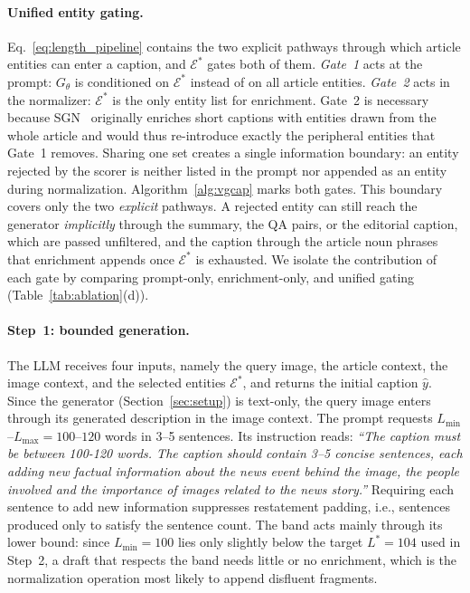 \documentclass[runningheads]{llncs}
\DeclareRobustCommand{\aciids}[1]{{\color{olive}#1}}
\DeclareRobustCommand{\revise}[1]{{\color{blue}#1}}
\DeclareRobustCommand{\todo}[1]{\ifblank{#1}%
     {{\color{red}\textbf{TBD}}}%
     {{\color{red}\textbf{[TODO:}~#1\textbf{]}}}}
\DeclareRobustCommand{\aciids}[1]{#1}
\DeclareRobustCommand{\revise}[1]{#1}
\DeclareRobustCommand{\todo}[1]{\PackageError{revision}{Unresolved TODO}{}}
\begin{document}
\paragraph{\aciids{Unified entity gating.}}
\label{sec:entity_conditioning}
\aciids{Eq.~\eqref{eq:length_pipeline} contains the two explicit pathways through which article entities can enter a caption, and $\mathcal{E}^{*}$ gates both of them. \emph{Gate~1} acts at the prompt: $G_{\theta}$ is conditioned on $\mathcal{E}^{*}$ instead of on all article entities. \emph{Gate~2} acts in the normalizer: $\mathcal{E}^{*}$ is the only \revise{entity list} for enrichment. Gate~2 is necessary because SGN~\cite{recap} originally enriches short captions with entities drawn from the whole article and would thus re-introduce exactly the peripheral entities that Gate~1 removes. Sharing one set creates a single information boundary: \revise{an entity rejected by the scorer is neither listed in the prompt nor appended as an entity during normalization.} Algorithm~\ref{alg:vgcap} marks both gates.}
\aciids{This boundary covers only the two \emph{explicit} pathways. A rejected entity can still reach the generator \emph{implicitly} through the summary, the QA pairs, or the editorial caption, which are passed unfiltered\revise{, and the caption through the article noun phrases that enrichment appends once $\mathcal{E}^{*}$ is exhausted}. We isolate the contribution of each gate by comparing prompt-only, enrichment-only, and unified gating (Table~\ref{tab:ablation}(d)).} %

\paragraph{\aciids{Step~1: bounded generation.}} \aciids{The LLM receives four inputs, namely the query image, the article context, the image context, and the selected entities $\mathcal{E}^{*}$, and returns the initial caption $\hat{y}$.} \revise{Since the generator (Section~\ref{sec:setup}) is text-only, the query image enters through its generated description in the image context.} The prompt requests $L_{\min}$--$L_{\max}=100$--$120$ words in 3--5 sentences. \revise{Its instruction reads: \emph{``The caption must be between 100-120 words. The caption should contain 3--5 concise sentences, each adding new factual information about the news event behind the image, the people involved and the importance of images related to the news story.''} Requiring each sentence to add new information suppresses restatement padding, i.e., sentences produced only to satisfy the sentence count.} \aciids{The band acts mainly through its lower bound: since $L_{\min}{=}100$ lies only slightly below the target $L^{*}{=}104$ used in Step~2, a draft that respects the band needs little or no enrichment, which is the normalization operation most likely to append disfluent fragments.} %
\end{document}
